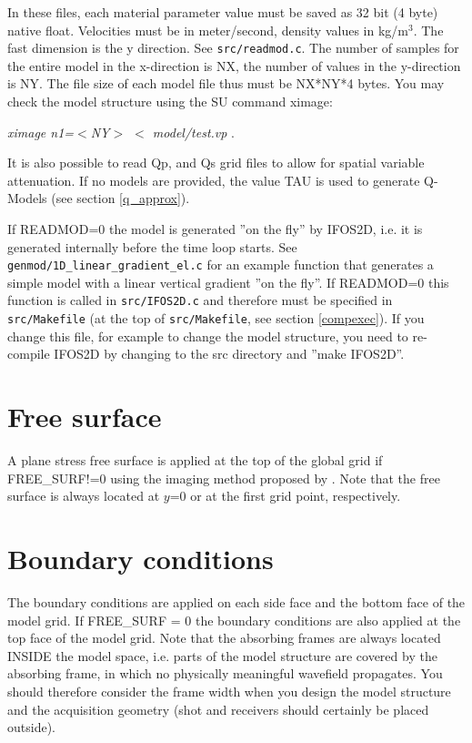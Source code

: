 In these files, each material parameter value must be saved as 32 bit (4 byte) native float. Velocities must be in meter/second, density values in kg/m$^3$. The fast dimension is the y direction. See \texttt{src/readmod.c}. The number of samples for the entire model in the x-direction is NX, the number of values in the y-direction is NY. The file size of each model file thus must be NX*NY*4 bytes. You may check the model structure using the SU command ximage:
\newline

\textit{ximage n1=$<$NY$>$ $<$ model/test.vp} .
\newline

It is also possible to read Qp, and Qs grid files to allow for spatial variable attenuation. If no models are provided, the value TAU is used to generate Q-Models (see section \ref{q_approx}).

If READMOD=0 the model is generated ''on the fly'' by IFOS2D, i.e. it is generated internally before the time loop starts. See \texttt{genmod/1D\_linear\_gradient\_el.c} for an example function that generates a simple model with a linear vertical gradient ''on the fly''. If READMOD=0 this function is called in \texttt{src/IFOS2D.c} and therefore must be specified in \texttt{src/Makefile} (at the top of \texttt{src/Makefile}, see section \ref{compexec}). If you change this file, for example to change the model structure, you need to re-compile IFOS2D by changing to the src directory and ''make IFOS2D''.


\section{Free surface}  
{\color{blue}{\begin{verbatim}
"Free Surface" : "comment",
			"FREE_SURF" : "1",
\end{verbatim}}}
A plane stress free surface is applied at the top of the global grid if FREE\_SURF!=0 using the imaging method proposed by \cite{levander:88}. Note that the free surface is always located at $y$=0 or at the first grid point, respectively.


\section{Boundary conditions}
\label{abs}
{\color{blue}{\begin{verbatim}
"PML Boundary" : "comment",
			"FW" : "20",
			"VPPML" : "600.0",
			"FPML" : "31.25",
			"BOUNDARY" : "0",
			"npower" : "4.0",
			"k_max_PML" : "8.0",

\end{verbatim}}}
The boundary conditions are applied on each side face and the bottom face of the model grid. If FREE\_SURF = 0 the boundary conditions are also applied at the top face of the model grid. Note that the absorbing frames are always located INSIDE the model space, i.e. parts of the model structure are covered by the absorbing frame, in which no physically meaningful wavefield propagates. You should therefore consider the frame width when you design the model structure and the acquisition geometry (shot and receivers should certainly be placed outside).

